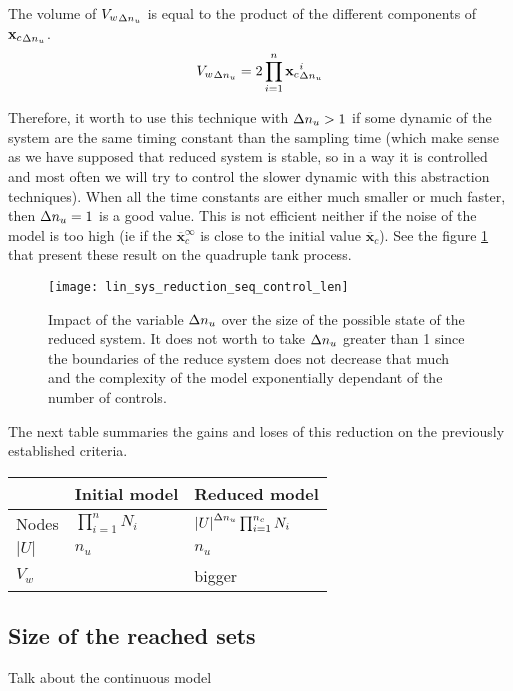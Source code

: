 The volume of ${V_w}_{\Delta n_u}$ is equal to the product of the different components of ${\mathbf{x}_c}_{\Delta n_u}$.
\begin{equation}
{V_w}_{\Delta n_u} = 2 \prod_{i=1}^n
{\mathbf{x}_c}_{\Delta n_u}^i
\end{equation}

Therefore, it worth to use this technique with $\Delta n_u>1$ if some dynamic of the system are the same timing constant than the sampling time (which make sense as we have supposed that reduced system is stable, so in a way it is controlled and most often we will try to control the slower dynamic with this abstraction techniques). When all the time constants are either much smaller or much faster, then $\Delta n_u = 1$ is a good value.
This is not efficient neither if the noise of the model is too high (ie if the $\overline{\mathbf{x}}_c^{\infty}$ is close to the initial value $\overline{\mathbf{x}}_c$). See the figure \ref{reduced_system_bounds} that present these result on the quadruple tank process.

\begin{figure}[!ht]
  \centering
  \texttt{[image: lin\_sys\_reduction\_seq\_control\_len]}
  \caption{Impact of the variable $\Delta n_u$ over the size of the possible state of the reduced system. It does not worth to take $\Delta n_u$ greater than 1 since the boundaries of the reduce system does not decrease that much and the complexity of the model exponentially dependant of the number of controls.}
  \label{reduced_system_bounds}
\end{figure}

The next table summaries the gains and loses of this reduction on the previously established criteria.

\begin{tabular}{ l|ll }
& Initial model & Reduced model\\ \hline
Nodes & $\prod_{i=1}^n N_i$ & $\left | U \right |^{\Delta n_u} \prod_{i=1}^{n_c} N_i $\\ 
$|U|$ & $n_u$ & $n_u$\\
$V_w$ &  & bigger \\
\end{tabular}

\subsection{Size of the reached sets}
Talk about the continuous model

